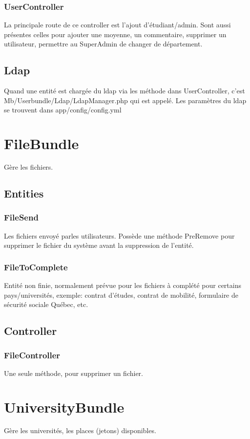 \subsubsection{UserController}
La principale route de ce controller est l'ajout d'étudiant/admin.
Sont aussi présentes celles pour ajouter une moyenne, un commentaire, supprimer un utilisateur, permettre au SuperAdmin de changer de département.


\subsection{Ldap}
Quand une entité est chargée du ldap via les méthode dans UserController, c'est  Mb/Userbundle/Ldap/LdapManager.php qui est appelé.
Les paramètres du ldap se trouvent dans app/config/config.yml


\section{FileBundle}
Gère les fichiers.

\subsection{Entities}
\subsubsection{FileSend}
Les fichiers envoyé parles utilisateurs. Possède une méthode PreRemove pour supprimer le fichier du système avant la suppression de l'entité.

\subsubsection{FileToComplete}
Entité non finie, normalement prévue pour les fichiers à complété pour certains pays/universités, exemple: contrat d'études, contrat de mobilité, formulaire de sécurité sociale Québec, etc.


\subsection{Controller}
\subsubsection{FileController}
Une seule méthode, pour supprimer un fichier.


\section{UniversityBundle}
Gère les universités, les places (jetons) disponibles.

